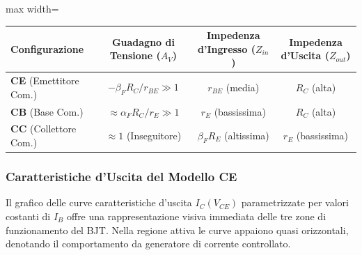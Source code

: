 \begin{center}
\begin{adjustbox}{max width=\textwidth}
\renewcommand{\arraystretch}{1.3}
\begin{tabular}{lccc}
    \hline
    \textbf{Configurazione} & \textbf{Guadagno di Tensione} ($A_V$) & \textbf{Impedenza d'Ingresso} ($Z_{in}$) & \textbf{Impedenza d'Uscita} ($Z_{out}$) \\
    \hline
    \textbf{CE} (Emettitore Com.) & $-\beta_F R_C/r_{BE} \gg 1$ & $r_{BE}$ (media) & $R_C$ (alta) \\
    \textbf{CB} (Base Com.)       & $\approx\alpha_F R_C/r_E \gg 1$ & $r_E$ (bassissima) & $R_C$ (alta) \\
    \textbf{CC} (Collettore Com.) & $\approx 1$ (Inseguitore) & $\beta_F R_E$ (altissima) & $r_E$ (bassissima) \\
    \hline
\end{tabular}
\end{adjustbox}
\end{center}

\vspace{0.3cm}
\subsubsection{Caratteristiche d'Uscita del Modello CE}
Il grafico delle curve caratteristiche d'uscita $I_C(V_{CE})$ parametrizzate per valori costanti di $I_B$ offre una rappresentazione visiva immediata delle tre zone di funzionamento del BJT. Nella regione attiva le curve appaiono quasi orizzontali, denotando il comportamento da generatore di corrente controllato.

